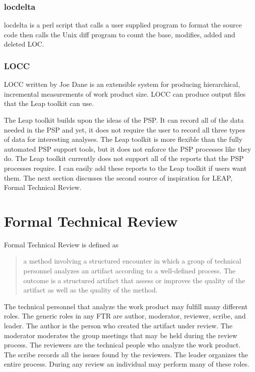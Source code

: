 \subsubsection{locdelta}

locdelta\cite{Resources98} is a perl script that calls a user supplied
program to format the source code then calls the Unix diff program to count the
base, modifies, added and deleted LOC.

\subsubsection{LOCC}

LOCC\cite{Dane99} written by Joe Dane is an extensible system for producing
hierarchical, incremental measurements of work product size. LOCC can produce
output files that the Leap toolkit can use.


The Leap toolkit builds upon the ideas of the PSP.  It can record all of the
data needed in the PSP and yet, it does not require the user to record all
three types of data for interesting analyses.  The Leap toolkit is more
flexible than the fully automated PSP support tools, but it does not enforce
the PSP processes like they do.  The Leap toolkit currently does not support
all of the reports that the PSP processes require.  I can easily add these
reports to the Leap toolkit if users want them.  The next section discusses the 
second source of inspiration for LEAP, Formal Technical Review.

\section{Formal Technical Review}
Formal Technical Review is defined as 
\begin{quote}
a method involving a structured encounter in which a group of technical
personnel analyzes an artifact according to a well-defined process.  The
outcome is a structured artifact that assess or improves the quality of the
artifact as well as the quality of the method.\cite{FTRPages99}
\end{quote}

The technical personnel that analyze the work product may fulfill many
different roles.  The generic roles in any FTR are author, moderator, reviewer,
scribe, and leader.  The author is the person who created the artifact under
review. The moderator moderates the group meetings that may be held during the
review process. The reviewers are the technical people who analyze the work
product. The scribe records all the issues found by the reviewers.  The leader
organizes the entire process.  During any review an individual may perform many
of these roles.


